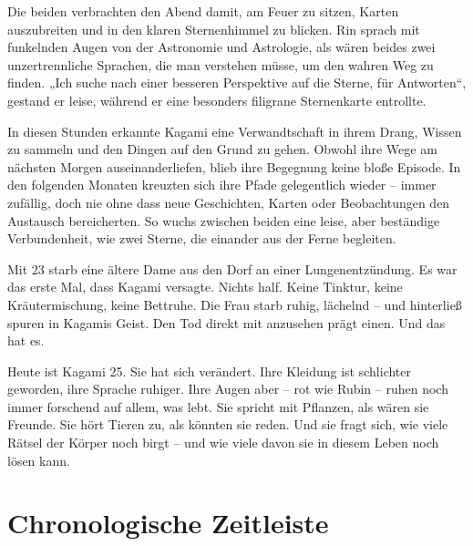 \documentclass[12pt,a4paper]{article}
\begin{document}
Die beiden verbrachten den Abend damit, am Feuer zu sitzen, Karten auszubreiten und in den klaren Sternenhimmel zu blicken. Rin sprach mit funkelnden Augen von der Astronomie und Astrologie, als wären beides zwei unzertrennliche Sprachen, die man verstehen müsse, um den wahren Weg zu finden. „Ich suche nach einer besseren Perspektive auf die Sterne, für Antworten“, gestand er leise, während er eine besonders filigrane Sternenkarte entrollte.

In diesen Stunden erkannte Kagami eine Verwandtschaft in ihrem Drang, Wissen zu sammeln und den Dingen auf den Grund zu gehen. Obwohl ihre Wege am nächsten Morgen auseinanderliefen, blieb ihre Begegnung keine bloße Episode. In den folgenden Monaten kreuzten sich ihre Pfade gelegentlich wieder – immer zufällig, doch nie ohne dass neue Geschichten, Karten oder Beobachtungen den Austausch bereicherten. So wuchs zwischen beiden eine leise, aber beständige Verbundenheit, wie zwei Sterne, die einander aus der Ferne begleiten.

Mit 23 starb eine ältere Dame aus den Dorf an einer Lungenentzündung. Es war das erste Mal, dass Kagami versagte. Nichts half. Keine Tinktur, keine Kräutermischung, keine Bettruhe. Die Frau starb ruhig, lächelnd – und hinterließ spuren in Kagamis Geist. Den Tod direkt mit anzusehen prägt einen. Und das hat es.

Heute ist Kagami 25. Sie hat sich verändert. Ihre Kleidung ist schlichter geworden, ihre Sprache ruhiger. Ihre Augen aber – rot wie Rubin – ruhen noch immer forschend auf allem, was lebt. Sie spricht mit Pflanzen, als wären sie Freunde. Sie hört Tieren zu, als könnten sie reden. Und sie fragt sich, wie viele Rätsel der Körper noch birgt – und wie viele davon sie in diesem Leben noch lösen kann.

\newpage

\section{Chronologische Zeitleiste}
\end{document}
